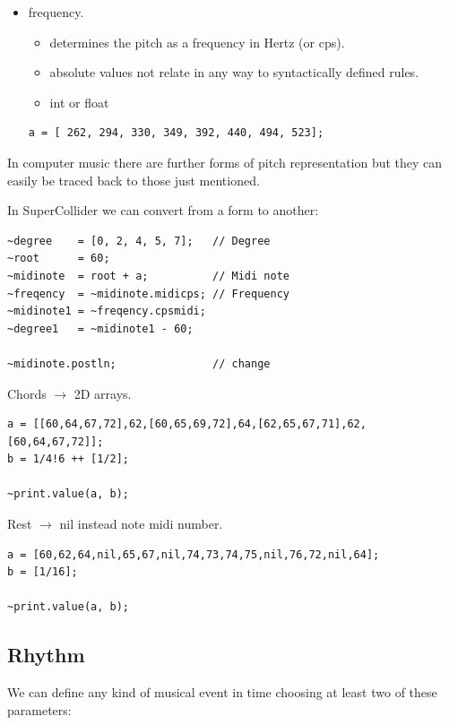 \begin{itemize}
\item frequency.
  \begin{itemize}
  \tightlist
  \item determines the pitch as a frequency in Hertz (or cps).
  \item absolute values not relate in any way to syntactically defined rules.
  \item int or float
  \end{itemize}

\begin{lstlisting}[frame=single] 
a = [ 262, 294, 330, 349, 392, 440, 494, 523]; 
\end{lstlisting}
\end{itemize}

In computer music there are further forms of pitch representation but they can easily be traced back to those just mentioned.

In SuperCollider we can convert from a form to another:

\begin{lstlisting}[frame=single] 
~degree    = [0, 2, 4, 5, 7];   // Degree
~root      = 60;
~midinote  = root + a;          // Midi note   
~freqency  = ~midinote.midicps; // Frequency
~midinote1 = ~freqency.cpsmidi;
~degree1   = ~midinote1 - 60;

~midinote.postln;               // change
\end{lstlisting}

Chords \(\rightarrow\) 2D arrays.

\begin{lstlisting}[frame=single] 
a = [[60,64,67,72],62,[60,65,69,72],64,[62,65,67,71],62,[60,64,67,72]];
b = 1/4!6 ++ [1/2];

~print.value(a, b);
\end{lstlisting}

Rest \(\rightarrow\) nil instead note midi number.

\begin{lstlisting}[frame=single] 
a = [60,62,64,nil,65,67,nil,74,73,74,75,nil,76,72,nil,64];
b = [1/16];

~print.value(a, b);
\end{lstlisting}

\subsection{Rhythm}\label{rhythm}

We can define any kind of musical event in time choosing at least two of these parameters:

